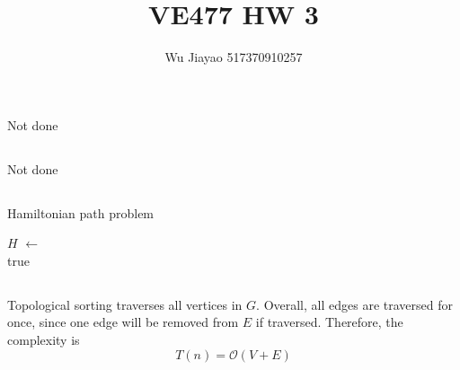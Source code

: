 \documentclass[12pt,a4paper]{article}
\title{VE477 HW 3}
\author{Wu Jiayao 517370910257}
\theoremstyle{definition}
\begin{document}
\maketitle

\section{}
\subsection{}
    Not done
\subsection{}
    Not done
\subsection{}
\begin{algorithm}[H]
    \BlankLine
    \caption{Hamiltonian path problem}
    $H$ $\gets$  \\
    \Return true
\end{algorithm}
\subsection{}
    Topological sorting traverses all vertices in $G$. Overall, all edges are traversed for once, since one edge will be removed from $E$ if traversed. Therefore, the complexity is
    $$
        T(n) = \mathcal{O}(V + E)
    $$
\end{document}
